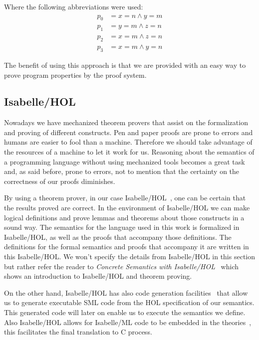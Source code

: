 Where the following abbreviations were used:
\begin{align*}
p_{0} &= x=n \land y=m\\
p_{1} &= y=m \land z=n\\
p_{2} &= x=m \land z=n\\
p_{3} &= x=m \land y=n
\end{align*}

The benefit of using this approach is that we are provided with an easy way to prove program properties by the proof system.


\subsection{Isabelle/HOL}\label{section:isabelle/hol}

Nowadays we have mechanized theorem provers that assist on the formalization and proving of different constructs.
Pen and paper proofs are prone to errors and humans are easier to fool than a machine.
Therefore we should take advantage of the resources of a machine to let it work for us.
Reasoning about the semantics of a programming language without using mechanized tools becomes a great task and, as said before, prone to errors, not to mention that the certainty on the correctness of our proofs diminishes.

By using a theorem prover, in our case Isabelle/HOL~\parencite{isabelle-tutorial}, one can be certain that the results proved are correct.
In the environment of Isabelle/HOL we can make logical definitions and prove lemmas and theorems about those constructs in a sound way.
The semantics for the language used in this work is formalized in Isabelle/HOL, as well as the proofs that accompany those definitions.
The definitions for the formal semantics and proofs that accompany it are written in this Isabelle/HOL.
We won't specify the details from Isabelle/HOL in this section but rather refer the reader to \textit{Concrete Semantics with Isabelle/HOL}~\parencite{nipkow} which shows an introduction to Isabelle/HOL and theorem proving.

On the other hand, Isabelle/HOL has also code generation facilities~\parencite{isabelle-codegen} that allow us to generate executable SML code from the HOL specification of our semantics.
This generated code will later on enable us to execute the semantics we define.
Also Isabelle/HOL allows for Isabelle/ML code to be embedded in the theories~\parencite{isabelle-implementation}, this facilitates the final translation to C process.


